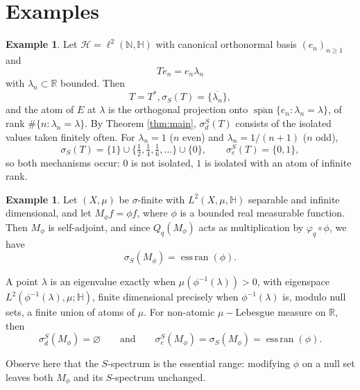\documentclass[12pt,a4paper]{article}
\theoremstyle{plain}
\theoremstyle{definition}
\newtheorem{example}[theorem]{Example}
\theoremstyle{remark}
\newcommand{\HH}{\mathbb H}
\newcommand{\RR}{\mathbb R}
\newcommand{\NN}{\mathbb N}
\newcommand{\HS}{\mathcal H}
\newcommand{\sigS}{\sigma_S}
\newcommand{\sigeS}{\sigma_{e}^{S}}
\newcommand{\sigdS}{\sigma_{d}^{S}}
\DeclareMathOperator{\essran}{ess\,ran}
\begin{document}
{\section{Examples}
\label{sec:examples}

\begin{example}
\label{ex:diagonal}
Let $\HS=\ell^2(\NN,\HH)$ with canonical orthonormal basis
$(e_n)_{n\ge1}$ and $$Te_n=e_n\lambda_n$$ with $\lambda_n\subset\RR$
bounded. Then $$T=T^*, \sigS(T)=\overline{\{\lambda_n\}},$$ and the
atom of $E$ at $\lambda$ is the orthogonal projection onto
$\overline{\operatorname{span}}\{e_n:\lambda_n=\lambda\}$, of rank
$\#\{n:\lambda_n=\lambda\}$. By Theorem \ref{thm:main}, $\sigdS(T)$
consists of the isolated values taken finitely often. For
$\lambda_n=1$ ($n$ even) and $\lambda_n=1/(n+1)$ ($n$ odd),
\[
 \sigS(T)=\{1\}\cup\{\tfrac12,\tfrac14,\tfrac16,\dots\}\cup\{0\},
 \qquad
 \sigeS(T)=\{0,1\},
\]
so both mechanisms occur: $0$ is not isolated, $1$ is isolated with an
atom of infinite rank.
\end{example}

\begin{example}
\label{ex:multiplication}
Let $(X,\mu)$ be $\sigma$-finite with $L^2(X,\mu,\HH)$ separable and
infinite dimensional, and let $M_\phi f=\phi f$, where $\phi$ is a bounded real measurable function. Then $M_\phi$ is self-adjoint, and since $Q_q(M_\phi)$ acts as multiplication by $\varphi_q\circ\phi$, we have
\[
\sigS(M_\phi)=\essran(\phi).
\]

A point $\lambda$ is an eigenvalue
exactly when $\mu(\phi^{-1}(\lambda))>0$, with eigenspace
$L^2(\phi^{-1}(\lambda),\mu;\HH)$, finite dimensional precisely when
$\phi^{-1}(\lambda)$ is, modulo null sets, a finite union of atoms of
$\mu$. For non-atomic $\mu-$Lebesgue measure on $\RR$, then
\[
\sigdS(M_\phi)=\varnothing
\qquad\text{and}\qquad
\sigeS(M_\phi)=\sigS(M_\phi)=\essran(\phi).
\]

Observe here that the $S$-spectrum is the essential range: modifying $\phi$ on a null set leaves both $M_\phi$ and its $S$-spectrum unchanged.
\end{example}

}
\end{document}
